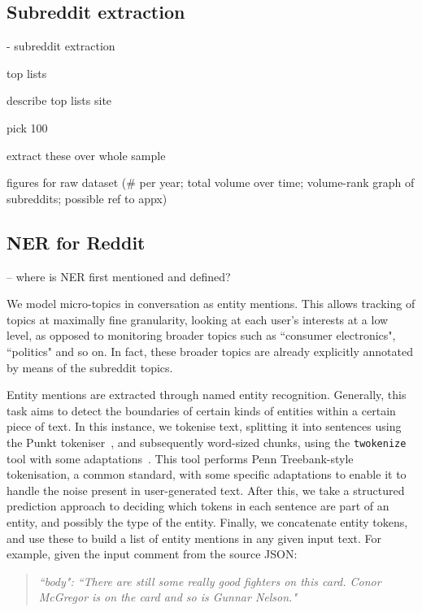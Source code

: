 \documentclass[journal,10pt,draftclsnofoot,onecolumn]{IEEEtran}
\begin{document}
\subsection{Subreddit extraction}

- subreddit extraction

top lists

describe top lists site

pick 100

extract these over whole sample

figures for raw dataset (\# per year; total volume over time; volume-rank graph of subreddits; possible ref to appx)

\subsection{NER for Reddit}

-- where is NER first mentioned and defined?

We model micro-topics in conversation as entity mentions.
This allows tracking of topics at maximally fine granularity, looking at each user's interests at a low level, as opposed to monitoring broader topics such as ``consumer electronics", ``politics" and so on.
In fact, these broader topics are already explicitly annotated by means of the subreddit topics.

Entity mentions are extracted through named entity recognition.
Generally, this task aims to detect the boundaries of certain kinds of entities within a certain piece of text.
In this instance, we tokenise text, splitting it into sentences using the Punkt tokeniser~\cite{kiss2006unsupervised}, and subsequently word-sized chunks, using the {\tt twokenize} tool with some adaptations~\cite{o2010tweetmotif}.
This tool performs Penn Treebank-style tokenisation, a common standard, with some specific adaptations to enable it to handle the noise present in user-generated text.
After this, we take a structured prediction approach to deciding which tokens in each sentence are part of an entity, and possibly the type of the entity.
Finally, we concatenate entity tokens, and use these to build a list of entity mentions in any given input text.
For example, given the input comment from the source JSON:

\begin{quote}
\emph{``body": ``There are still some really good fighters on this card. Conor McGregor is on the card and so is Gunnar Nelson."}
\end{quote}
\end{document}
